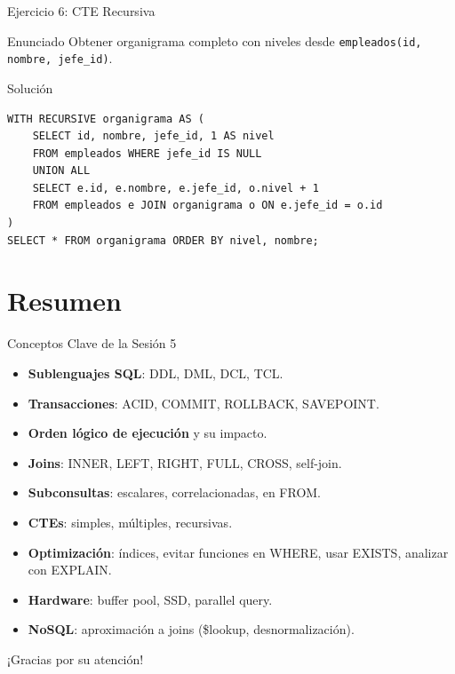 \documentclass[aspectratio=169, 10pt, xcolor=table]{beamer}
\begin{document}
\begin{frame}[fragile]{Ejercicio 6: CTE Recursiva}
    \begin{block}{Enunciado}
        Obtener organigrama completo con niveles desde \texttt{empleados(id, nombre, jefe\_id)}.
    \end{block}
    \begin{block}{Solución}
        \begin{lstlisting}
WITH RECURSIVE organigrama AS (
    SELECT id, nombre, jefe_id, 1 AS nivel
    FROM empleados WHERE jefe_id IS NULL
    UNION ALL
    SELECT e.id, e.nombre, e.jefe_id, o.nivel + 1
    FROM empleados e JOIN organigrama o ON e.jefe_id = o.id
)
SELECT * FROM organigrama ORDER BY nivel, nombre;
        \end{lstlisting}
    \end{block}
\end{frame}

\section{Resumen}

\begin{frame}{Conceptos Clave de la Sesión 5}
    \begin{itemize}
        \item \textbf{Sublenguajes SQL}: DDL, DML, DCL, TCL.
        \item \textbf{Transacciones}: ACID, COMMIT, ROLLBACK, SAVEPOINT.
        \item \textbf{Orden lógico de ejecución} y su impacto.
        \item \textbf{Joins}: INNER, LEFT, RIGHT, FULL, CROSS, self-join.
        \item \textbf{Subconsultas}: escalares, correlacionadas, en FROM.
        \item \textbf{CTEs}: simples, múltiples, recursivas.
        \item \textbf{Optimización}: índices, evitar funciones en WHERE, usar EXISTS, analizar con EXPLAIN.
        \item \textbf{Hardware}: buffer pool, SSD, parallel query.
        \item \textbf{NoSQL}: aproximación a joins (\$lookup, desnormalización).
    \end{itemize}
\end{frame}

\begin{frame}
    \centering

    
    \vspace{1cm}
    \large ¡Gracias por su atención!
\end{frame}
\end{document}
